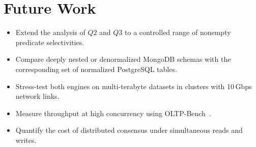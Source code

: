 \documentclass[10pt,a4paper,twocolumn]{article}
\begin{document}
\section*{Future Work}

\begin{itemize}
  \item Extend the analysis of $Q2$ and $Q3$ to a controlled range of nonempty predicate selectivities.
  \item Compare deeply nested or denormalized MongoDB schemas with the corresponding set of normalized PostgreSQL tables.
  \item Stress-test both engines on multi-terabyte datasets in clusters with 10\,Gbps network links.
  \item Measure throughput at high concurrency using OLTP-Bench~\cite{difallah2013oltpbench}.
  \item Quantify the cost of distributed consensus under simultaneous reads and writes.
\end{itemize}
\end{document}
